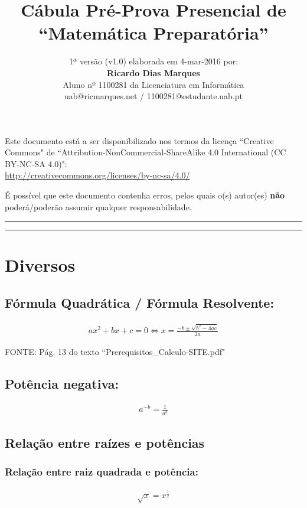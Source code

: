 \documentclass[portuguese,a4paper,12pt,onecolumn,fleqn]{article}
\title{Cábula Pré-Prova Presencial de \\``Matemática Preparatória''}
\author{1ª versão (v1.0) elaborada em 4-mar-2016 por:
\\\textbf{Ricardo Dias Marques}\\
Aluno nº 1100281 da Licenciatura em Informática\\
uab@ricmarques.net / 1100281@estudante.uab.pt}
\newcommand{\myline}{\par
  \kern3pt %
  \hrule height 1.5pt
  \kern2pt %
  \hrule height 0.8pt
  \kern3pt %
}
\begin{document}
\maketitle

Este documento está a ser disponibilizado nos termos da licença ``Creative Commons" de 
``Attribution-NonCommercial-ShareAlike 4.0 International (CC BY-NC-SA 4.0)":\\
\url{http://creativecommons.org/licenses/by-nc-sa/4.0/}

É possível que este documento contenha erros, pelos quais o(s) autor(es) \textbf{não} poderá/poderão assumir qualquer responsabilidade.


\myline	%


\section*{Diversos}

\subsection*{Fórmula Quadrática / Fórmula Resolvente:}


\begin{gather*}
ax^2 + bx + c = 0 
\Leftrightarrow x = \frac{-b \pm \sqrt{b^2 - 4ac}}{2a}
\end{gather*}

FONTE: Pág. 13 do texto ``Prerequisitos\_Calculo-SITE.pdf"


\subsection*{Potência negativa:}

\begin{gather*}
a^{-b} = \frac{1}{a^b}
\end{gather*}

\subsection*{Relação entre raízes e potências}

\subsubsection*{Relação entre raiz quadrada e potência:}

\begin{gather*}
\sqrt{x}  = x^\frac{1}{2}
\end{gather*}
\end{document}
